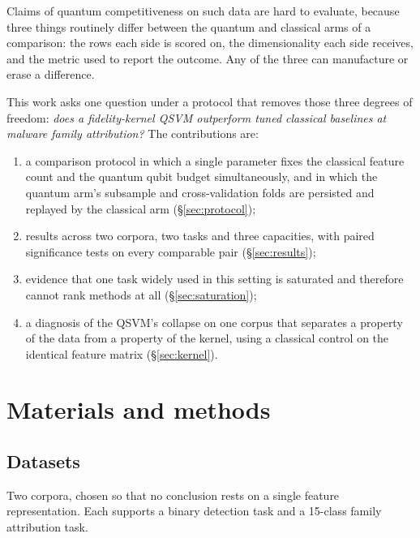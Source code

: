 \documentclass[11pt]{article}
\begin{document}
Claims of quantum competitiveness on such data are hard to evaluate, because
three things routinely differ between the quantum and classical arms of a
comparison: the rows each side is scored on, the dimensionality each side
receives, and the metric used to report the outcome. Any of the three can
manufacture or erase a difference.

This work asks one question under a protocol that removes those three degrees of
freedom: \emph{does a fidelity-kernel QSVM outperform tuned classical baselines
at malware family attribution?} The contributions are:

\begin{enumerate}
\item a comparison protocol in which a single parameter fixes the classical
feature count and the quantum qubit budget simultaneously, and in which the
quantum arm's subsample and cross-validation folds are persisted and replayed by
the classical arm (§\ref{sec:protocol});
\item results across two corpora, two tasks and three capacities, with paired
significance tests on every comparable pair (§\ref{sec:results});
\item evidence that one task widely used in this setting is saturated and
therefore cannot rank methods at all (§\ref{sec:saturation});
\item a diagnosis of the QSVM's collapse on one corpus that separates a property
of the data from a property of the kernel, using a classical control on the
identical feature matrix (§\ref{sec:kernel}).
\end{enumerate}

\section{Materials and methods}
\label{sec:methods}

\subsection{Datasets}

Two corpora, chosen so that no conclusion rests on a single feature
representation. Each supports a binary detection task and a 15-class family
attribution task.
\end{document}
